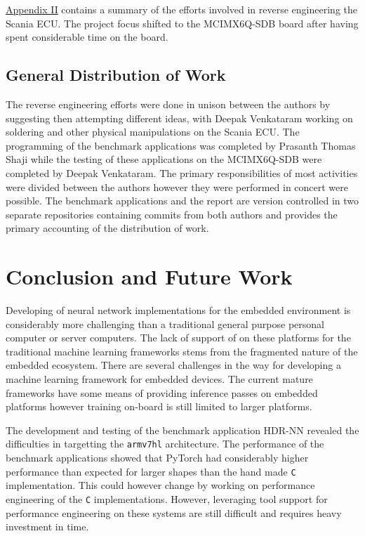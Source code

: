 \hyperref[rtc-c300]{Appendix II} contains a summary of the efforts involved in reverse engineering the Scania ECU. The project focus shifted to the MCIMX6Q-SDB board after having spent considerable time on the board.

\section{General Distribution of Work}

The reverse engineering efforts were done in unison between the authors by suggesting then attempting different ideas, with Deepak Venkataram working on soldering and other physical manipulations on the Scania ECU. The programming of the benchmark applications was completed by Prasanth Thomas Shaji while the testing of these applications on the MCIMX6Q-SDB were completed by Deepak Venkataram. The primary responsibilities of most activities were divided between the authors however they were performed in concert were possible. The benchmark applications and the report are version controlled in two separate repositories containing commits from both authors and provides the primary accounting of the distribution of work.

\chapter{Conclusion and Future Work}

Developing of neural network implementations for the embedded environment is considerably more challenging than a traditional general purpose personal computer or server computers. The lack of support of on these platforms for the traditional machine learning frameworks stems from the fragmented nature of the embedded ecosystem. There are several challenges in the way for developing a machine learning framework for embedded devices. The current mature frameworks have some means of providing inference passes on embedded platforms however training on-board is still limited to larger platforms.

The development and testing of the benchmark application HDR-NN revealed the difficulties in targetting the \texttt{armv7hl} architecture. The performance of the benchmark applications showed that PyTorch had considerably higher performance than expected for larger shapes than the hand made \texttt{C} implementation. This could however change by working on performance engineering of the \texttt{C} implementations. However, leveraging tool support for performance engineering on these systems are still difficult and requires heavy investment in time.

